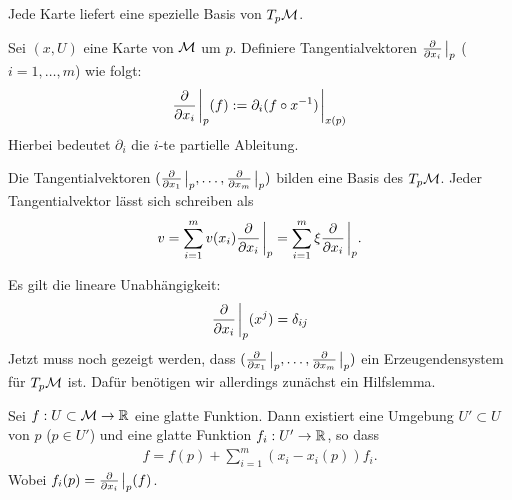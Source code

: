 Jede Karte liefert eine spezielle Basis von $T_p \mathcal{M}$.

\begin{defs}
Sei $(x, U)$ eine Karte von $\mathcal{M}$ um $p$. 
Definiere Tangentialvektoren $\pdv{x_i} \eval_{p} $ ($i = 1, \dots, m$) wie folgt:
\begin{align}
\pdv{x_i}\eval_{p} (f) := \partial_i (f \circ x^{-1}) \eval_{x(p)}
\end{align}
Hierbei bedeutet $\partial_i$ die $i$-te partielle Ableitung.
\end{defs}

\begin{satz}
\label{satz:BasisTPM}
Die Tangentialvektoren $(\pdv{x_1}\eval_{p}, \dots, \pdv{x_m}\eval_{p})$ bilden eine Basis des $T_{p} \mathcal{M}$.
Jeder Tangentialvektor lässt sich schreiben als
\begin{align}
v = \sum_{i=1}^{m} v(x_i) \pdv{x_i}\eval_{p} = \sum_{i=1}^{m} \xi \pdv{x_i}\eval_{p}.
\end{align}
\end{satz}
\begin{bew}
Es gilt die lineare Unabhängigkeit:
\begin{align}
\pdv{x_i}\eval_{p} (x^j) = \delta_{i j}
\end{align}
Jetzt muss noch gezeigt werden, dass $(\pdv{x_1}\eval_{p}, \dots, \pdv{x_m}\eval_{p})$ ein Erzeugendensystem für $T_{p} \mathcal{M}$ ist.
 Dafür benötigen wir allerdings zunächst ein Hilfslemma.
\end{bew}

\begin{hlem}
\label{hlem:DarstellungBasisTPM}
Sei $f: U \subset \mathcal{M} \to \mathbb{R}$ eine glatte Funktion.
Dann existiert eine Umgebung $U' \subset U$ von $p$ ($p \in U'$) und eine glatte Funktion
$f_i: U' \to \mathbb{R}$, so dass
\begin{align}
f = f(p) + \sum_{i=1}^{m} ( x_i  - x_i(p)) f_i.
\end{align}
Wobei $f_i (p) = \pdv{x_i}\eval_{p} (f)$.
\end{hlem}

